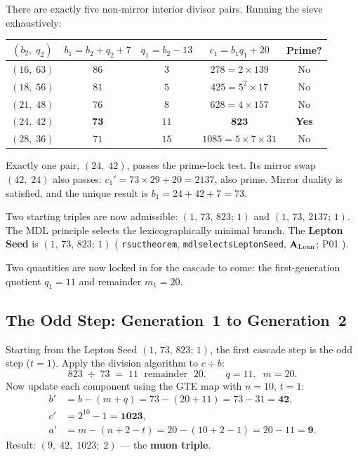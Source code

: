 \documentclass[11pt,openany]{book}
\theoremstyle{remark}
\newcommand{\lean}[1]{%
  \penalty-100
  \begingroup\def\_{\textunderscore\allowbreak}\texttt{#1}\endgroup}
\newcommand{\CatAL}{\ensuremath{\textbf{A}_{\rm Lean}}}
\begin{document}
There are exactly five non-mirror interior divisor pairs.
Running the sieve exhaustively:

\begin{center}
\small
\renewcommand{\arraystretch}{1.35}
\begin{tabular}{@{}ccccc@{}}
\toprule
$(b_2,\;q_2)$ & $b_1 = b_2+q_2+7$ & $q_1 = b_2-13$ &
  $c_1 = b_1 q_1 + 20$ & Prime? \\
\midrule
$(16,\;63)$ & $86$ & $3$  & $278 = 2\times 139$           & No  \\
$(18,\;56)$ & $81$ & $5$  & $425 = 5^2\times 17$          & No  \\
$(21,\;48)$ & $76$ & $8$  & $628 = 4\times 157$           & No  \\
$(24,\;42)$ & $\mathbf{73}$ & $11$ & $\mathbf{823}$        & \textbf{Yes} \\
$(28,\;36)$ & $71$ & $15$ & $1085 = 5\times 7\times 31$  & No  \\
\bottomrule
\end{tabular}
\end{center}

Exactly one pair, $(24,\;42)$, passes the prime-lock test.
Its mirror swap $(42,\;24)$ also passes: $c_1' = 73 \times 29 + 20 = 2137$, also prime.
Mirror duality is satisfied, and the unique result is $b_1 = 24 + 42 + 7 = 73$.

Two starting triples are now admissible: $(1,\,73,\,823;\,1)$ and $(1,\,73,\,2137;\,1)$.
The MDL principle selects the lexicographically minimal branch.
The \textbf{Lepton Seed} is $(1,\,73,\,823;\,1)$
(\lean{rsuc\_theorem}, \lean{mdl\_selects\_LeptonSeed}, \CatAL; P01 \cite{SpivackSM}).

Two quantities are now locked in for the cascade to come:
the first-generation quotient $q_1 = 11$ and remainder $m_1 = 20$.

\subsection{The Odd Step: Generation~1 to Generation~2}
\label{sec:gte_cascade_odd}

Starting from the Lepton Seed $(1,\,73,\,823;\,1)$, the first cascade step
is the odd step ($t = 1$).
Apply the division algorithm to $c \div b$:
\[
  823 \;\div\; 73 \;=\; 11 \;\text{ remainder }\; 20.
  \qquad q = 11,\;\; m = 20.
\]
Now update each component using the GTE map with $n = 10$, $t = 1$:
\begin{align*}
  b' &= b - (m + q) = 73 - (20 + 11) = 73 - 31 = \mathbf{42}, \\
  c' &= 2^{10} - 1 = \mathbf{1023}, \\
  a' &= m - (n + 2 - t) = 20 - (10 + 2 - 1) = 20 - 11 = \mathbf{9}.
\end{align*}
Result: $(9,\;42,\;1023;\;2)$ --- the \textbf{muon triple}.
\end{document}
